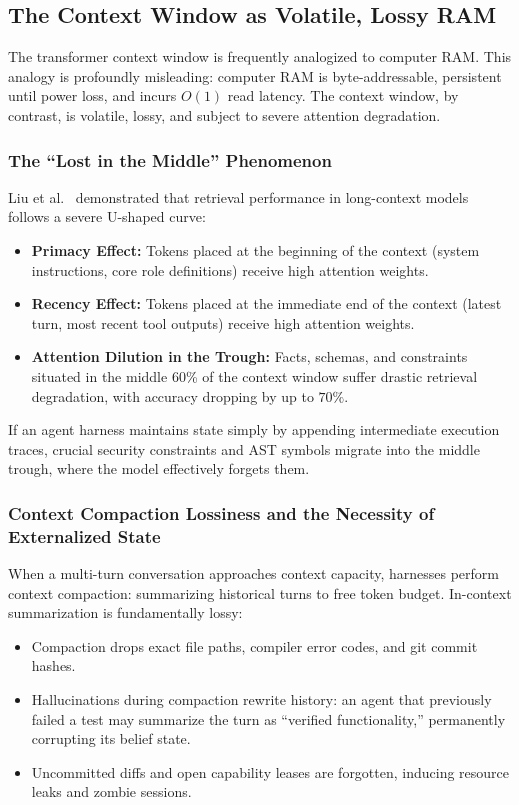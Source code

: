\subsection{The Context Window as Volatile, Lossy RAM}

The transformer context window is frequently analogized to computer RAM. This analogy is profoundly misleading: computer RAM is byte-addressable, persistent until power loss, and incurs $O(1)$ read latency. The context window, by contrast, is volatile, lossy, and subject to severe attention degradation.

\subsubsection{The ``Lost in the Middle'' Phenomenon}
Liu et al.~ demonstrated that retrieval performance in long-context models follows a severe U-shaped curve:
\begin{itemize}[leftmargin=1.8em,itemsep=2pt]
  \item \textbf{Primacy Effect:} Tokens placed at the beginning of the context (system instructions, core role definitions) receive high attention weights.
  \item \textbf{Recency Effect:} Tokens placed at the immediate end of the context (latest turn, most recent tool outputs) receive high attention weights.
  \item \textbf{Attention Dilution in the Trough:} Facts, schemas, and constraints situated in the middle 60\% of the context window suffer drastic retrieval degradation, with accuracy dropping by up to $70\%$.
\end{itemize}
If an agent harness maintains state simply by appending intermediate execution traces, crucial security constraints and AST symbols migrate into the middle trough, where the model effectively forgets them.

\subsubsection{Context Compaction Lossiness and the Necessity of Externalized State}
When a multi-turn conversation approaches context capacity, harnesses perform context compaction: summarizing historical turns to free token budget. In-context summarization is fundamentally lossy:
\begin{itemize}[leftmargin=1.8em,itemsep=2pt]
  \item Compaction drops exact file paths, compiler error codes, and git commit hashes.
  \item Hallucinations during compaction rewrite history: an agent that previously failed a test may summarize the turn as ``verified functionality,'' permanently corrupting its belief state.
  \item Uncommitted diffs and open capability leases are forgotten, inducing resource leaks and zombie sessions.
\end{itemize}

